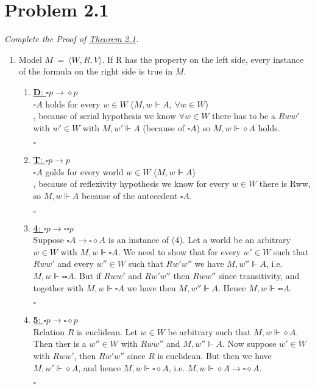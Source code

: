 \documentclass{report}
\begin{document}
	\pagestyle{fancy}
	\hfill
	
	\section*{Problem 2.1}
		\textit{Complete the Proof of \underline{Theorem 2.1}.}
		\begin{enumerate}[]
			\item Model $M \ = \ \langle W, R, V \rangle$. If R has the property on the left side, every instance of the formula on the right side is true in $M$.
			\begin{enumerate}[]
				\item \underline{\textbf{D}: $\square p \rightarrow \diamond p$} \\
					$\square A$ holds for every $w \in W$ ($M,w \Vdash A, \ \forall w \in W$) \\
					, because of serial hypothesis we know $\forall w \in W$ there has to be a $Rww'$ with $w' \in W$ with $M,w' \Vdash A$ (because of $\square A$) so $M,w \Vdash \diamond A$ holds.
					\begin{flushright}
						$\square$
					\end{flushright}
				\item \underline{\textbf{T}: $\square p \rightarrow p$} \\
					$\square A$ golds for every world $w \in W$ ($M,w \Vdash A$) \\
					, because of reflexivity hypothesis we know for every $w \in W$ there is Rww, so $M,w \Vdash A$ because of the antecedent $\square A$.
					\begin{flushright}
						$\square$
					\end{flushright}
				\item \underline{\textbf{4}: $\square p \rightarrow \square \square p$} \\
					Suppose $\square A \rightarrow \square \diamond A$ is an instance of (4). Let a world be an arbitrary $w \in W$ with $M, w \Vdash \square A$. We need to show that for every $w' \in W$ such that $Rww'$ and every $w'' \in W$ such that $Rw'w''$ we have $M, w'' \Vdash A$, i.e. $M, w \Vdash \square \square A$. But if $Rww'$ and $Rw'w''$ then $Rww''$ since transitivity, and together with $M, w \Vdash \square A$ we have then $M, w'' \Vdash A$. Hence $M, w \Vdash \square \square A$.
					\begin{flushright}
						$\square$
					\end{flushright}
				\item \underline{\textbf{5}: $\square p \rightarrow \square \diamond p$} \\
					Relation $R$ is euclidean. Let $w \in W$ be arbitrary such that $M,w \Vdash \diamond A$. Then ther is a $w'' \in W$ with $Rww''$ and $M,w'' \Vdash A$. Now suppose $w' \in W$ with $Rww'$, then $Rw'w''$ since $R$ is euclidean. But then we have $M, w' \Vdash \diamond A$, and hence $M,w \Vdash \square \diamond A$, i.e. $M,w \Vdash \diamond A \rightarrow \square \diamond A$.
					\begin{flushright}
						$\square$
					\end{flushright}
			\end{enumerate}
		\end{enumerate}
\end{document}
